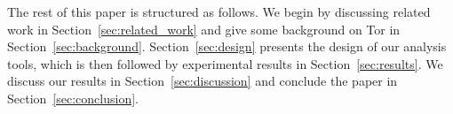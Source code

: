 The rest of this paper is structured as follows.  We begin by discussing related
work in Section~\ref{sec:related_work} and give some background on Tor in
Section~\ref{sec:background}.  Section~\ref{sec:design} presents the design of
our analysis tools, which is then followed by experimental results in
Section~\ref{sec:results}.  We discuss our results in
Section~\ref{sec:discussion} and conclude the paper in
Section~\ref{sec:conclusion}.
